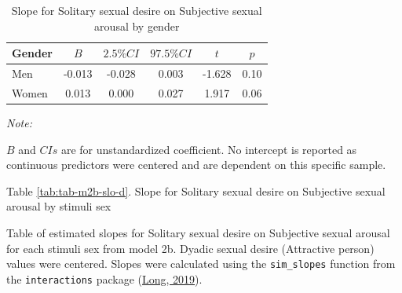 \documentclass[
  bookmarksnumbered]{article}
\begin{document}
\begin{table}[H]

\caption{\label{tab:tab-m2b-slo-c}Slope for Solitary sexual desire on Subjective sexual arousal by gender}
\centering
\begin{threeparttable}
\begin{tabular}[t]{lccccc}
\toprule
Gender & $B$ & $2.5\% CI$ & $97.5\% CI$ & $t$ & $p$\\
\midrule
Men & -0.013 & -0.028 & 0.003 & -1.628 & 0.10\\
Women & 0.013 & 0.000 & 0.027 & 1.917 & 0.06\\
\bottomrule
\end{tabular}
\begin{tablenotes}[para]
\item \textit{Note: } 
\item $B$ and $CIs$ are for unstandardized coefficient.
           No intercept is reported as continuous predictors were centered
           and are dependent on this specific sample.
\end{tablenotes}
\end{threeparttable}
\end{table}

Table \ref{tab:tab-m2b-slo-d}. Slope for Solitary sexual desire on Subjective sexual arousal by stimuli sex

Table of estimated slopes for Solitary sexual desire on Subjective sexual arousal for each stimuli sex from model 2b. Dyadic sexual desire (Attractive person) values were centered. Slopes were calculated using the \texttt{sim\_slopes} function from the \texttt{interactions} package (\protect\hyperlink{ref-interactionscit}{Long, 2019}).
\end{document}
